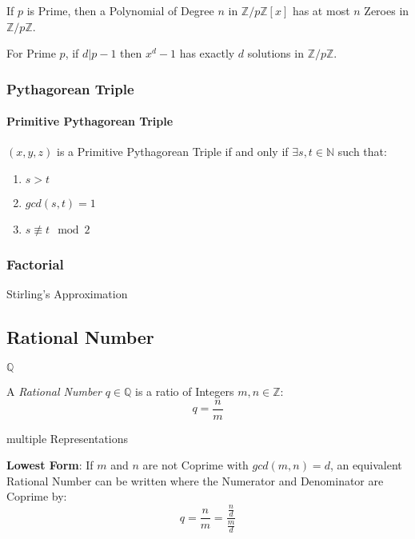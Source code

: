 If $p$ is Prime, then a Polynomial of Degree $n$ in
$\mathbb{Z}/p\mathbb{Z}[x]$ has at most $n$ Zeroes in
$\mathbb{Z}/p\mathbb{Z}$.

For Prime $p$, if $d|p-1$ then $x^d - 1$ has exactly $d$ solutions in
$\mathbb{Z}/p\mathbb{Z}$.



\subsubsection{Pythagorean Triple}\label{sec:pythagorean_triple}

\paragraph{Primitive Pythagorean Triple}\label{sec:primitive_pythagorean}\hfill

$(x,y,z)$ is a Primitive Pythagorean Triple if and only if $\exists
s,t \in \mathbb{N}$ such that:
\begin{enumerate}
  \item $s > t$
  \item $gcd (s,t) = 1$
  \item $s \not\equiv t \mod 2$
\end{enumerate}



\subsubsection{Factorial}\label{sec:factorial}

Stirling's Approximation



\subsection{Rational Number}\label{sec:rational}

$\mathbb{Q}$

A \emph{Rational Number} $q \in \mathbb{Q}$ is a ratio of Integers
$m,n \in \mathbb{Z}$:
\[
  q = \frac{n}{m}
\]

multiple Representations

\textbf{Lowest Form}: If $m$ and $n$ are not Coprime with $gcd (m,n) =
d$, an equivalent Rational Number can be written where the Numerator
and Denominator are Coprime by:
\[
  q = \frac{n}{m} = \frac{\frac{n}{d}}{\frac{m}{d}}
\]

